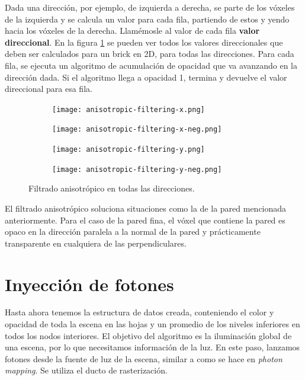 Dada una dirección, por ejemplo, de izquierda a derecha, se parte de los vóxeles de la izquierda y se calcula un valor para cada fila, partiendo de estos y yendo hacia los vóxeles de la derecha.
Llamémosle al valor de cada fila \textbf{valor direccional}.
En la figura \ref{fig:svo_filtering_anisotropic} se pueden ver todos los valores direccionales que deben ser calculados para un brick en 2D, para todas las direcciones.
Para cada fila, se ejecuta un algoritmo de acumulación de opacidad que va avanzando en la dirección dada.
Si el algoritmo llega a opacidad 1, termina y devuelve el valor direccional para esa fila.

\begin{figure}
    \begin{center}
        \begin{subfigure}{.24\textwidth}
            \texttt{[image: anisotropic-filtering-x.png]}
        \end{subfigure}
        \begin{subfigure}{.24\textwidth}
            \texttt{[image: anisotropic-filtering-x-neg.png]}
        \end{subfigure}
        \begin{subfigure}{.24\textwidth}
            \texttt{[image: anisotropic-filtering-y.png]}
        \end{subfigure}
        \begin{subfigure}{.24\textwidth}
            \texttt{[image: anisotropic-filtering-y-neg.png]}
        \end{subfigure}
    \end{center}
    \caption{Filtrado anisotrópico en todas las direcciones.}
    \label{fig:svo_filtering_anisotropic}
\end{figure}

El filtrado anisotrópico soluciona situaciones como la de la pared mencionada anteriormente.
Para el caso de la pared fina, el vóxel que contiene la pared es opaco en la dirección paralela a la normal de la pared y prácticamente transparente en cualquiera de las perpendiculares.

\section{Inyección de fotones}\label{sec:photon-injection}

Hasta ahora tenemos la estructura de datos creada, conteniendo el color y opacidad de toda la escena en las hojas y un promedio de los niveles inferiores en todos los nodos interiores.
El objetivo del algoritmo es la iluminación global de una escena, por lo que necesitamos información de la luz.
En este paso, lanzamos fotones desde la fuente de luz de la escena, similar a como se hace en \textit{photon mapping}.
Se utiliza el ducto de rasterización.


